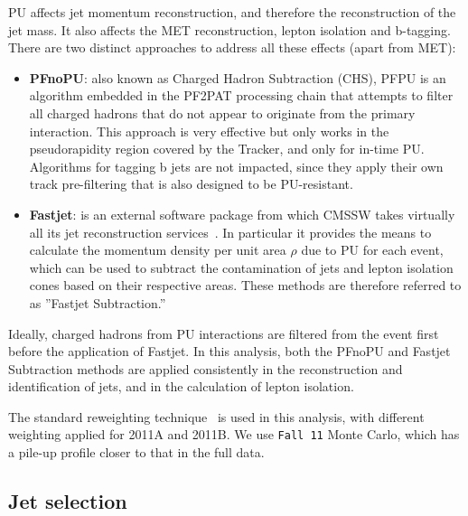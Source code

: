 PU affects jet momentum reconstruction, and therefore the reconstruction of the jet 
mass.  It also affects the MET reconstruction, 
lepton isolation and b-tagging.  There are two distinct approaches to address all these 
effects (apart from MET):
\begin{itemize}
 \item {\bf PFnoPU}: also known as Charged Hadron Subtraction (CHS), 
       PFPU is an algorithm embedded in the PF2PAT processing chain that attempts to 
       filter all charged hadrons that do not appear to originate from the primary 
       interaction.  This approach is very effective but only works in the pseudorapidity 
       region covered by the Tracker, and only for in-time PU.  Algorithms for tagging b 
       jets are not impacted, since they apply their own track pre-filtering that is also 
       designed to be PU-resistant.
 \item {\bf Fastjet}: is an external software package from which CMSSW takes virtually 
       all its jet reconstruction services~\cite{FastJet}.  In particular it provides the 
       means to calculate the momentum density per unit area $\rho$ due to PU for each 
       event, which can be used to subtract the contamination of jets and lepton isolation 
       cones based on their respective areas.  These methods are therefore referred 
       to as ''Fastjet Subtraction.'' 
\end{itemize}
Ideally, charged hadrons from PU interactions are filtered from the event first before
the application of Fastjet. In this analysis, both the PFnoPU and Fastjet Subtraction 
methods are applied consistently in the reconstruction and identification of jets,
and in the calculation of lepton isolation.

The standard reweighting technique~\cite{PUreweight} is used in this analysis, with
different weighting applied for 2011A and 2011B.  We use {\tt Fall 11} Monte Carlo, which
has a pile-up profile closer to that in the full data.


\subsection{Jet selection}
\label{sec:jet_cuts}

